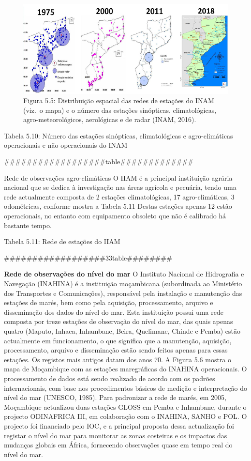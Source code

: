 \documentclass[
]{book}
\begin{document}
\begin{figure}
\centering
\includegraphics{images/estacoes_INAM.png}
\caption{Figura 5.5: Distribuição espacial das redes de estações do INAM (viz.~o mapa) e o número das estações sinópticas, climatológicas, agro-meteorológicos, aerológicas e de radar (INAM, 2016).}
\end{figure}

Tabela 5.10: Número das estações sinópticas, climatológicas e agro-climáticas operacionais e não operacionais do INAM

\#\#\#\#\#\#\#\#\#\#\#\#\#\#\#\#\#\#table\#\#\#\#\#\#\#\#\#\#\#\#\#

Rede de observações agro-climáticas
O IIAM é a principal instituição agrária nacional que se dedica à investigação nas áreas agrícola e pecuária, tendo uma rede actualmente composta de 2 estações climatológicas, 17 agro-climáticas, 3 odométricas, conforme mostra a Tabela 5.11 Destas estações apenas 12 estão operacionais, no entanto com equipamento obsoleto que não é calibrado há bastante tempo.

Tabela 5.11: Rede de estações do IIAM

\#\#\#\#\#\#\#\#\#\#\#\#\#\#\#\#\#\#33table\#\#\#\#\#\#\#\#

\textbf{Rede de observações do nível do mar}
O Instituto Nacional de Hidrografia e Navegação (INAHINA) é a instituição moçambicana (subordinada ao Ministério dos Transportes e Comunicações), responsável pela instalação e manutenção das estações de marés, bem como pela aquisição, processamento, arquivo e disseminação dos dados do nível do mar. Esta instituição possui uma rede composta por treze estações de observação do nível do mar, das quais apenas quatro (Maputo, Inhaca, Inhambane, Beira, Quelimane, Chinde e Pemba) estão actualmente em funcionamento, o que significa que a manutenção, aquisição, processamento, arquivo e disseminação estão sendo feitos apenas para essas estações. Os registos mais antigos datam dos anos 70. A Figura 5.6 mostra o mapa de Moçambique com as estações maregráficas do INAHINA operacionais. O processamento de dados está sendo realizado de acordo com os padrões internacionais, com base nos procedimentos básicos de medição e interpretação do nível do mar (UNESCO, 1985). Para padronizar a rede de marés, em 2005, Moçambique actualizou duas estações GLOSS em Pemba e Inhambane, durante o projecto ODINAFRICA III, em colaboração com o INAHINA, SANHO e POL. O projecto foi financiado pelo IOC, e a principal proposta dessa actualização foi registar o nível do mar para monitorar as zonas costeiras e os impactos das mudanças globais em África, fornecendo observações quase em tempo real do nível do mar.
\end{document}
